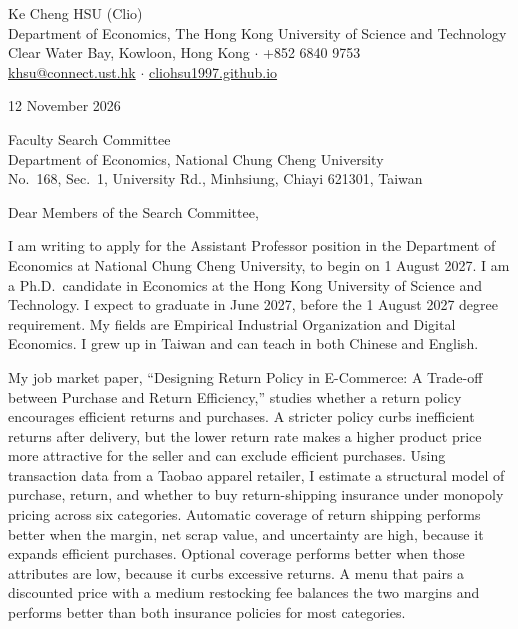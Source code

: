 \documentclass[11pt]{article}
\begin{document}
\begin{flushleft}
Ke Cheng HSU (Clio) \\
Department of Economics, The Hong Kong University of Science and Technology \\
Clear Water Bay, Kowloon, Hong Kong $\cdot$ +852 6840 9753 \\
\href{mailto:khsu@connect.ust.hk}{khsu@connect.ust.hk} $\cdot$ \href{https://cliohsu1997.github.io/}{cliohsu1997.github.io}
\end{flushleft}

12 November 2026

\vspace{0.12em}
Faculty Search Committee \\
Department of Economics, National Chung Cheng University \\
No.\ 168, Sec.\ 1, University Rd., Minhsiung, Chiayi 621301, Taiwan

\vspace{0.12em}
Dear Members of the Search Committee,

I am writing to apply for the Assistant Professor position in the Department of Economics at National Chung Cheng University, to begin on 1 August 2027. I am a Ph.D.\ candidate in Economics at the Hong Kong University of Science and Technology. I expect to graduate in June 2027, before the 1 August 2027 degree requirement. My fields are Empirical Industrial Organization and Digital Economics. I grew up in Taiwan and can teach in both Chinese and English.

My job market paper, ``Designing Return Policy in E-Commerce: A Trade-off between Purchase and Return Efficiency,'' studies whether a return policy encourages efficient returns and purchases. A stricter policy curbs inefficient returns after delivery, but the lower return rate makes a higher product price more attractive for the seller and can exclude efficient purchases. Using transaction data from a Taobao apparel retailer, I estimate a structural model of purchase, return, and whether to buy return-shipping insurance under monopoly pricing across six categories. Automatic coverage of return shipping performs better when the margin, net scrap value, and uncertainty are high, because it expands efficient purchases. Optional coverage performs better when those attributes are low, because it curbs excessive returns. A menu that pairs a discounted price with a medium restocking fee balances the two margins and performs better than both insurance policies for most categories.
\end{document}
